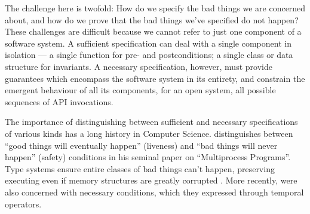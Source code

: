 
The challenge here is twofold: How do we specify the bad things we are
concerned about, and how do we prove that the bad things we've
specified do not happen?  These challenges are difficult because we
cannot refer to just one component of a software system.  A sufficient
specification can deal with a single component in isolation --- a
single function for pre- and postconditions; a single class or data
structure for invariants. A necessary specification, however, must
provide guarantees which encompass the software system in its
entirety, and constrain the emergent behaviour of all its components,
for an open system, all possible sequences of API invocations.




The importance of distinguishing between sufficient and necessary
specifications of various kinds has a long history in Computer
Science. \citeauthor{Lamport77} distinguishes between ``good things
will eventually happen'' (liveness) and ``bad things will never
happen'' (safety) conditions in his seminal paper on ``Multiprocess
Programs''.  Type systems ensure entire classes of bad things can't
happen, preserving executing even if memory structures are greatly
corrupted \cite{Rinard03}.
More recently, \citeauthor{FASE} were also concerned with 
 necessary conditions, which they expressed through temporal
 operators.



